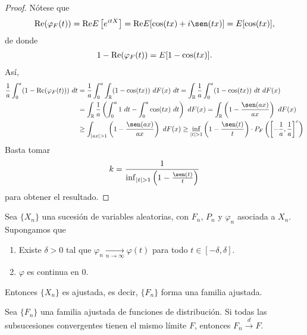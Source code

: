 \begin{proof}
    Nótese que
    \begin{align*}
        \re ( \varphi_F(t)) = \re E\left[e^{itX} \right] = \re E[\cos(tx) + i\sen(tx)] = E[\cos(tx)],
    \end{align*}
    de donde
    \begin{align*}
        1 - \text{Re} (\varphi_F(t)) = E[1- \cos(tx)].
    \end{align*}
    Así,
    \begin{align*}
        \frac{1}{a} \int_{0}^{a} (1 - \re (\varphi_F(t))) \ dt & = \frac{1}{a} \int_{0}^{a} \int_{\mathbb{R}} (1 - \cos(tx)) \ dF(x) \ dt = \int_{\mathbb{R}} \frac{1}{a} \int_{0}^{a} (1 - \cos(tx)) \ dt \ dF(x)                                             \\
                                                               & = \int_{\mathbb{R}} \frac{1}{a} \left( \int_{0}^{a} 1 \ dt - \int_{0}^{a} \cos(tx) \ dt\right) \ dF(x) = \int_{\mathbb{R}} \left( 1 - \frac{\sen(ax)}{ax} \right) \ dF(x)                     \\
                                                               & \ge \int_{|ax|>1} \left( 1 - \frac{\sen(ax)}{ax} \right) \ dF(x) \ge \inf_{|t| > 1} \left( 1 - \frac{\sen(t)}{t} \right) \cdot  P_F\left( \left[ - \frac{1}{a}, \frac{1}{a} \right]^c \right)
    \end{align*}
    Basta tomar
    \begin{align*}
        k = \frac{1}{\inf_{|t| > 1} \left( 1 - \frac{\sen(t)}{t} \right)}
    \end{align*}
    para obtener el resultado.
\end{proof}

\begin{cor} \label{cor1}
    Sea $\{X_n\}$ una sucesión de variables aleatorias, con $F_n$, $P_n$ y $\varphi_n$ asociada a $X_n$. Supongamos que
    \begin{enumerate}
        \item Existe $\delta > 0$ tal que $\varphi_n \xrightarrow[n \to \infty]{} \varphi(t)$ para todo $t \in [-\delta,\delta]$.
        \item $\varphi$ es continua en $0$.
    \end{enumerate}
    Entonces $\{X_n\}$ es ajustada, es decir, $\{F_n\}$ forma una familia ajustada.
\end{cor}

\begin{teo} \label{teo1}
    Sea $\{F_n\}$ una familia ajustada de funciones de distribución. Si todas las subsucesiones convergentes tienen el mismo límite $F$, entonces $F_n \xrightarrow[]{d} F$.
\end{teo}

